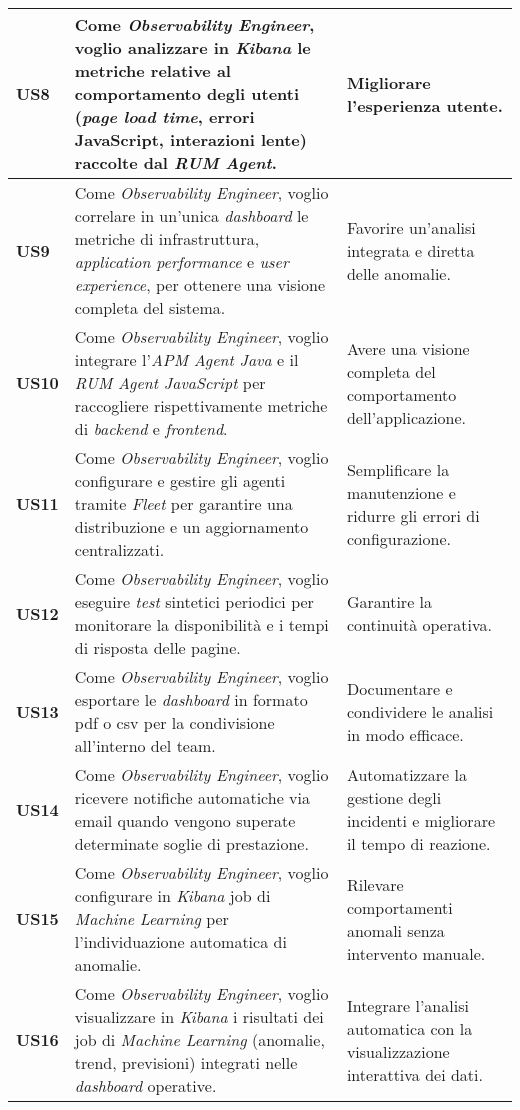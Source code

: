 \begin{longtable}{|p{1cm}|p{8cm}|p{3cm}|}
\textbf{US8} & Come \emph{Observability Engineer}, voglio analizzare in \emph{Kibana} le metriche relative al comportamento degli utenti (\emph{page load time}, errori JavaScript, interazioni lente) raccolte dal \emph{RUM Agent}. & Migliorare l'esperienza utente. \\
\hline

\textbf{US9} & Come \emph{Observability Engineer}, voglio correlare in un'unica \emph{dashboard} le metriche di infrastruttura, \emph{application performance} e \emph{user experience}, per ottenere una visione completa del sistema. & Favorire un'analisi integrata e diretta delle anomalie. \\
\hline

\textbf{US10} & Come \emph{Observability Engineer}, voglio integrare l'\emph{APM Agent Java} e il \emph{RUM Agent JavaScript} per raccogliere rispettivamente metriche di \emph{backend} e \emph{frontend}. & Avere una visione completa del comportamento dell'applicazione. \\
\hline

\textbf{US11} & Come \emph{Observability Engineer}, voglio configurare e gestire gli agenti tramite \emph{Fleet} per garantire una distribuzione e un aggiornamento centralizzati. & Semplificare la manutenzione e ridurre gli errori di configurazione. \\
\hline

\textbf{US12} & Come \emph{Observability Engineer}, voglio eseguire \emph{test} sintetici periodici per monitorare la disponibilità e i tempi di risposta delle pagine. & Garantire la continuità operativa. \\
\hline

\textbf{US13} & Come \emph{Observability Engineer}, voglio esportare le \emph{dashboard} in formato \gls{pdf} o \gls{csv} per la condivisione all'interno del team. & Documentare e condividere le analisi in modo efficace. \\
\hline

\textbf{US14} & Come \emph{Observability Engineer}, voglio ricevere notifiche automatiche via email quando vengono superate determinate soglie di prestazione. & Automatizzare la gestione degli incidenti e migliorare il tempo di reazione. \\
\hline

\textbf{US15} & Come \emph{Observability Engineer}, voglio configurare in \emph{Kibana} job di \emph{Machine Learning} per l’individuazione automatica di anomalie. & Rilevare comportamenti anomali senza intervento manuale. \\
\hline

\textbf{US16} & Come \emph{Observability Engineer}, voglio visualizzare in \emph{Kibana} i risultati dei job di \emph{Machine Learning} (anomalie, trend, previsioni) integrati nelle \emph{dashboard} operative. & Integrare l'analisi automatica con la visualizzazione interattiva dei dati. \\
\hline

\end{longtable}


